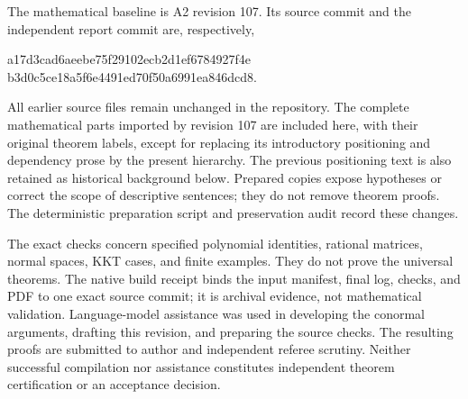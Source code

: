 The mathematical baseline is A2 revision 107. Its source commit and the independent report commit are, respectively,
\begin{center}\small\ttfamily
a17d3cad6aeebe75f29102ecb2d1ef6784927f4e\\
b3d0c5ce18a5f6e4491ed70f50a6991ea846dcd8.
\end{center}
All earlier source files remain unchanged in the repository. The complete mathematical parts imported by revision 107 are included here, with their original theorem labels, except for replacing its introductory positioning and dependency prose by the present hierarchy. The previous positioning text is also retained as historical background below. Prepared copies expose hypotheses or correct the scope of descriptive sentences; they do not remove theorem proofs. The deterministic preparation script and preservation audit record these changes.

The exact checks concern specified polynomial identities, rational matrices, normal spaces, KKT cases, and finite examples. They do not prove the universal theorems. The native build receipt binds the input manifest, final log, checks, and PDF to one exact source commit; it is archival evidence, not mathematical validation. Language-model assistance was used in developing the conormal arguments, drafting this revision, and preparing the source checks. The resulting proofs are submitted to author and independent referee scrutiny. Neither successful compilation nor assistance constitutes independent theorem certification or an acceptance decision.
